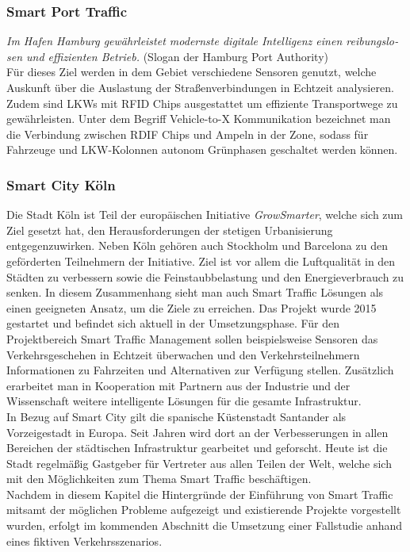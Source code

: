 \subsubsection{Smart Port Traffic}
\emph{Im Ha­fen Ham­burg ge­währ­leis­tet mo­derns­te di­gi­ta­le In­tel­li­genz ei­nen rei­bungs­lo­sen und ef­fi­zi­en­ten Be­trieb.} (Slogan der Hamburg Port Authority)\\
Für dieses Ziel werden in dem Gebiet verschiedene Sensoren genutzt, welche  Auskunft über die Auslastung der Straßenverbindungen in Echtzeit analysieren. Zudem sind LKWs mit RFID Chips ausgestattet um effiziente Transportwege zu gewährleisten. Unter dem Begriff Vehicle-to-X Kommunikation bezeichnet man die Verbindung zwischen RDIF Chips und Ampeln in der Zone, sodass für Fahrzeuge und LKW-Kolonnen autonom Grünphasen geschaltet werden können.

\subsubsection{Smart City Köln}
Die Stadt Köln ist Teil der europäischen Initiative \emph{GrowSmarter}, welche sich zum Ziel gesetzt hat, den Herausforderungen der stetigen Urbanisierung entgegenzuwirken. Neben Köln gehören auch Stockholm und Barcelona zu den geförderten Teilnehmern der Initiative. Ziel ist vor allem die Luftqualität in den Städten zu verbessern sowie die Feinstaubbelastung und den Energieverbrauch zu senken. In diesem Zusammenhang sieht man auch Smart Traffic Lösungen als einen geeigneten Ansatz, um die Ziele zu erreichen. Das Projekt wurde 2015 gestartet und befindet sich aktuell in der Umsetzungsphase. Für den Projektbereich Smart Traffic Management sollen beispielsweise Sensoren das Verkehrsgeschehen in Echtzeit überwachen und den Verkehrsteilnehmern Informationen zu Fahrzeiten und Alternativen zur Verfügung stellen. Zusätzlich erarbeitet man in Kooperation mit Partnern aus der Industrie und der Wissenschaft weitere intelligente Lösungen für die gesamte Infrastruktur.\\
In Bezug auf Smart City gilt die spanische Küstenstadt Santander als Vorzeigestadt in Europa. Seit Jahren wird dort an der Verbesserungen in allen Bereichen der städtischen Infrastruktur gearbeitet und geforscht. Heute ist die Stadt regelmäßig Gastgeber für Vertreter aus allen Teilen der Welt, welche sich mit den Möglichkeiten zum Thema Smart Traffic beschäftigen.\\

Nachdem in diesem Kapitel die Hintergründe der Einführung von Smart Traffic mitsamt der möglichen Probleme aufgezeigt und existierende Projekte vorgestellt wurden, erfolgt im kommenden Abschnitt die Umsetzung einer Fallstudie anhand eines fiktiven Verkehrsszenarios.


\clearpage
